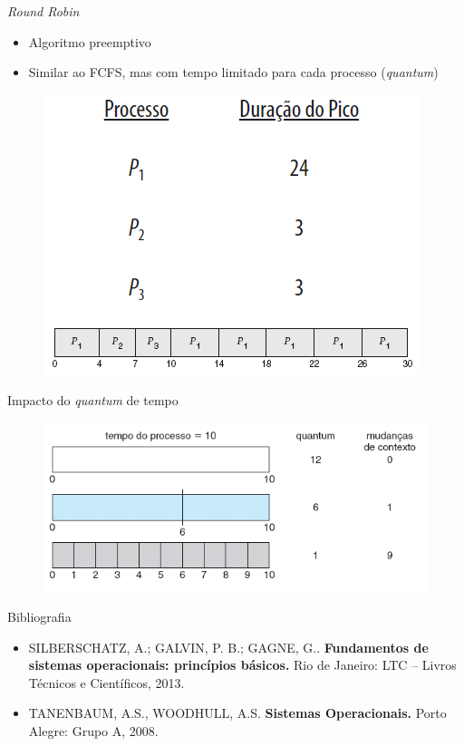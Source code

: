 \documentclass[aspectratio=169,
				xcolor=table]{beamer}
\begin{document}
	\begin{frame}{\textit{Round Robin}}
		\begin{itemize}
			\item Algoritmo preemptivo 
			\vspace{1em}
			\item Similar ao FCFS, mas com tempo limitado para cada processo (\textit{quantum})	
						
		\end{itemize}
		\begin{figure}[hbtp]
		\centering
		\includegraphics[keepaspectratio, height=.6\textheight]{../figs/cap06/rr.png}
		\end{figure}			
	\end{frame}	
	
	\begin{frame}{Impacto do \textit{quantum} de tempo}
		\begin{figure}[hbtp]
		\centering
		\includegraphics[keepaspectratio, height=.6\textheight]{../figs/cap06/quantum.png}
		\end{figure}					
	\end{frame}	
	
	\begin{frame}{Bibliografia}
		\begin{itemize}
			\item SILBERSCHATZ, A.; GALVIN, P. B.; GAGNE, G.. \textbf{Fundamentos de sistemas operacionais: princípios básicos.} Rio de Janeiro: LTC – Livros Técnicos e Científicos, 2013.
			
			\vspace{1em}

			\item TANENBAUM, A.S., WOODHULL, A.S. \textbf{Sistemas Operacionais.} Porto Alegre: Grupo A, 2008.
			
		\end{itemize}
	\end{frame}


	\begin{frame}{}
	\end{frame}	
	
\end{document}
